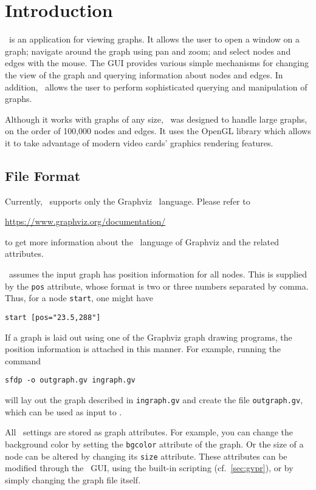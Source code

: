 \section{Introduction}
\label{sec:intro}

\smyrna\ is an application for viewing graphs. It allows the user
to open a window on a graph; navigate around the graph using pan
and zoom; and select nodes and edges with the mouse. The GUI provides various simple
mechanisms for changing the view of the graph and querying information about nodes and edges. 
In addition, \smyrna\
allows the user to perform sophisticated querying and
manipulation of graphs.

Although it works with graphs of any size, \smyrna\ was 
designed to handle large graphs, on the order of 100,000 nodes
and edges. It uses the OpenGL library which allows it to take advantage 
of modern video cards' graphics rendering features. 

\subsection{File Format} 
\label{sec:files}
Currently, \smyrna\ supports only the Graphviz \DOT\ language.
Please refer to 
\begin{center}
\url{https://www.graphviz.org/documentation/}
\end{center}
to get more information about the \DOT\ language of Graphviz and
the related attributes.

\smyrna\ assumes the input graph has position information
for all nodes. This is supplied by the {\tt pos} attribute, whose
format is two or three numbers separated by comma. Thus, for a
node {\tt start}, one might have
\begin{center}
{\tt start [pos="23.5,288"]}
\end{center}
If a graph is laid out using one of the Graphviz graph drawing programs,
the position information is attached in this manner. For example, running the
command
\begin{center}
{\tt sfdp -o outgraph.gv ingraph.gv}
\end{center}
will lay out the graph described in {\tt ingraph.gv} and create the file
{\tt outgraph.gv}, which can be used as input to \smyrna.

All \smyrna\ settings are stored as graph attributes.
For example, you can change the background color by setting the
{\tt bgcolor} attribute of the graph. Or the size of a 
node can be altered by changing its {\tt size} attribute. 
These attributes can be modified through the \smyrna\ GUI, 
using the built-in scripting (cf.~\ref{sec:gvpr}),
or by simply changing the graph file itself. 

